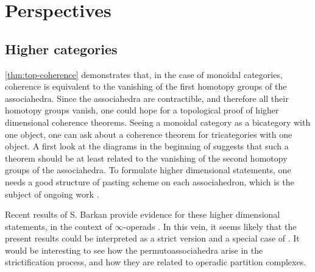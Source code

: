 
\section{Perspectives}

\subsection{Higher categories} 
\label{sec:higher}
\cref{thm:top-coherence} demonstrates that, in the case of monoidal categories, coherence is equivalent to the vanishing of the first homotopy groups of the associahedra. 
Since the associahedra are contractible, and therefore all their homotopy groups vanish, one could hope for a topological proof of higher dimensional coherence theorems.
Seeing a monoidal category as a bicategory with one object, one can ask about a coherence theorem for tricategories with one object. 
A first look at the diagrams in the beginning of \cite[Section 2]{gordonCoherenceTricategories1995} suggests that such a theorem should be at least related to the vanishing of the second homotopy groups of the associahedra.  
To formulate higher dimensional statements, one needs a good structure of pasting scheme on each associahedron, which is the subject of ongoing work \cite{AMMLA}. 

Recent results of S. Barkan provide evidence for these higher dimensional statements, in the context of $\infty$-operads \cite{barkanArityApproximationInfty2022}.
In this vein, it seems likely that the present results could be interpreted as a strict version and a special case of \cite[Theorem B]{barkanArityApproximationInfty2022}. 
It would be interesting to see how the permutoassociahedra arise in the strictification process, and how they are related to operadic partition complexes.  




